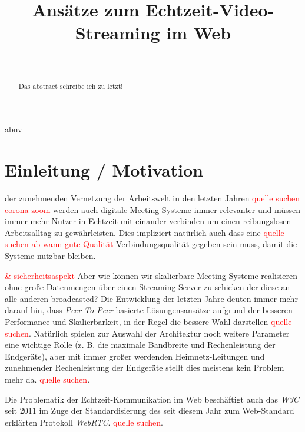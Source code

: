 \documentclass[journal]{IEEEtran}
\title{Ansätze zum Echtzeit-Video-Streaming im Web}
\author{
	\IEEEauthorblockN{Maximilian Schulke \textit{(Matrikel-Nr. 20215853)}}\\
	\IEEEauthorblockA{
		Technische Hochschule Brandenburg \\
		B.Sc. Medieninformatik \\
		Computergrafik
	}
}
\begin{document}

\maketitle

\begin{abstract}
	\lipsum[1-2][2-3]
	\lipsum[1-2][2-3]
	Das abstract schreibe ich zu letzt!
\end{abstract}

\tableofcontents

\newpage

\par
abnv

\section{Einleitung / Motivation}
 der zunehmenden Vernetzung der Arbeitswelt
in den letzten Jahren \textcolor{red}{quelle suchen corona zoom} werden auch
digitale Meeting-Systeme immer relevanter und müssen immer mehr Nutzer in
Echtzeit mit einander verbinden um einen reibungslosen Arbeitsalltag zu
gewährleisten. Dies impliziert natürlich auch dass eine \textcolor{red}{quelle
suchen ab wann gute Qualität} Verbindungsqualität gegeben sein muss, damit die
Systeme nutzbar bleiben.

\textcolor{red}{\& sicherheitsaspekt}
Aber wie können wir skalierbare Meeting-Systeme realisieren ohne große
Datenmengen über einen Streaming-Server zu schicken der diese an alle anderen
broadcasted? Die Entwicklung der letzten Jahre deuten immer mehr darauf hin,
dass \textit{Peer-To-Peer} basierte Lösungensansätze aufgrund der besseren
Performance und Skalierbarkeit, in der Regel die bessere Wahl darstellen
\textcolor{red}{quelle suchen}. Natürlich spielen zur Auswahl der Architektur
noch weitere Parameter eine wichtige Rolle (z. B. die maximale Bandbreite und
Rechenleistung der Endgeräte), aber mit immer großer werdenden
Heimnetz-Leitungen und zunehmender Rechenleistung der Endgeräte stellt dies
meistens kein Problem mehr da. \textcolor{red}{quelle suchen}.

Die Problematik der Echtzeit-Kommunikation im Web beschäftigt auch
das \textit{W3C} seit 2011 im Zuge der Standardisierung des seit diesem Jahr
zum Web-Standard erklärten Protokoll \textit{WebRTC}. \textcolor{red}{quelle
suchen}.
\end{document}
